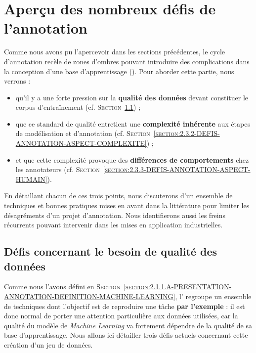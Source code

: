 \section{Aperçu des nombreux défis de l'annotation}
\label{section:2.3-DEFIS-ANNOTATION}

	
	Comme nous avons pu l'apercevoir dans les sections précédentes, le cycle d'annotation recèle de zones d'ombres pouvant introduire des complications dans la conception d'une base d'apprentissage (\cite{baledent:2022:complexite-annotation-manuelle}).
	Pour aborder cette partie, nous verrons :
	\begin{itemize}
		\item qu'il y a une forte pression sur la \textbf{qualité des données} devant constituer le corpus d'entraînement (cf. \textsc{Section~\ref{section:2.3.1-DEFIS-ANNOTATION-ASPECT-DONNEES}}) ;
		\item que ce standard de qualité entretient une \textbf{complexité inhérente} aux étapes de modélisation et d'annotation (cf. \textsc{Section~\ref{section:2.3.2-DEFIS-ANNOTATION-ASPECT-COMPLEXITE}}) ;
		\item et que cette complexité provoque des \textbf{différences de comportements} chez les annotateurs (cf. \textsc{Section~\ref{section:2.3.3-DEFIS-ANNOTATION-ASPECT-HUMAIN}}).
	\end{itemize}
	En détaillant chacun de ces trois points, nous discuterons d'un ensemble de techniques et bonnes pratiques mises en avant dans la littérature pour limiter les désagréments d'un projet d'annotation.
	Nous identifierons aussi les freins récurrents pouvant intervenir dans les mises en application industrielles.
	
	
	\subsection{Défis concernant le besoin de qualité des données}
	\label{section:2.3.1-DEFIS-ANNOTATION-ASPECT-DONNEES}
	
		Comme nous l'avons défini en \textsc{Section~\ref{section:2.1.1.A-PRESENTATION-ANNOTATION-DEFINITION-MACHINE-LEARNING}}, l' regroupe un ensemble de techniques dont l'objectif est de reproduire une tâche \textbf{par l'exemple} : il est donc normal de porter une attention particulière aux données utilisées, car la qualité du modèle de \textit{Machine Learning} va fortement dépendre de la qualité de sa base d'apprentissage.
		Nous allons ici détailler trois défis actuels concernant cette création d'un jeu de données.
		
